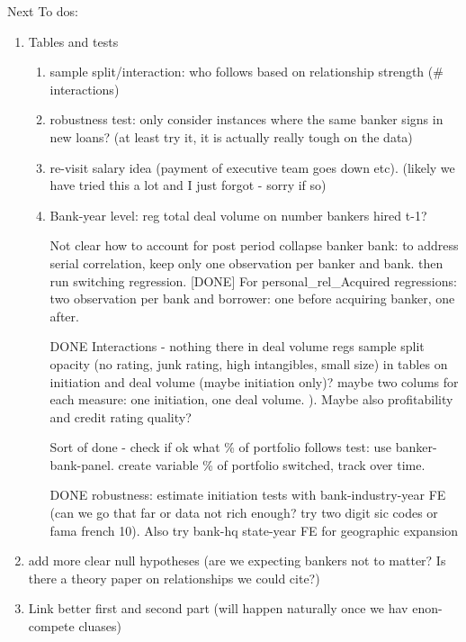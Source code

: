 Next To dos:

\begin{enumerate}
	\item Tables and tests
	
	\begin{enumerate}
		\item sample split/interaction: who follows based on relationship strength (\# interactions)
		\item robustness test: only consider instances where the same banker signs in new loans? (at least try it, it is actually really tough on the data)
		\item re-visit salary idea (payment of executive team goes down etc). (likely we have tried this a lot and I just forgot - sorry if so)
		\item Bank-year level: reg total deal volume on number bankers hired t-1?
		\item [Not clear how to account for post period] collapse banker bank: to address serial correlation, keep only one observation per banker and bank. then run switching regression. [DONE] For personal\_rel\_Acquired regressions: two observation per bank and borrower: one before acquiring banker, one after. 
		\item [DONE Interactions - nothing there in deal volume regs] sample split opacity (no rating, junk rating, high intangibles, small size) in tables on initiation and deal volume (maybe initiation only)? maybe two colums for each measure: one initiation, one deal volume. ). Maybe also profitability and credit rating quality?
		\item [Sort of done - check if ok] what \% of portfolio follows test: use banker-bank-panel. create variable \% of portfolio switched, track over time. 
		\item [DONE] robustness: estimate initiation tests with bank-industry-year FE (can we go that far or data not rich enough? try two digit sic codes or fama french 10). Also try bank-hq state-year FE for geographic expansion
		
	\end{enumerate}
	
	\item add more clear null hypotheses (are we expecting bankers not to matter? Is there a theory paper on relationships we could cite?)
	\item Link better first and second part (will happen naturally once we hav enon-compete cluases)
	
	
\end{enumerate}



